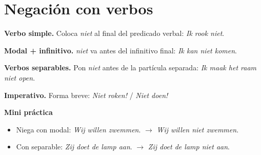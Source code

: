 \section{Negación con verbos}
\textbf{Verbo simple.} Coloca \textit{niet} al final del predicado verbal: \textit{Ik rook niet}.

\textbf{Modal + infinitivo.} \textit{niet} va antes del infinitivo final: \textit{Ik kan niet komen}.

\textbf{Verbos separables.} Pon \textit{niet} antes de la partícula separada: \textit{Ik maak het raam niet open}.

\textbf{Imperativo.} Forma breve: \textit{Niet roken!} / \textit{Niet doen!}

\textbf{Mini práctica}
\begin{itemize}[leftmargin=*]
  \item Niega con modal: \textit{Wij willen zwemmen}. $\rightarrow$ \textit{Wij willen niet zwemmen}.
  \item Con separable: \textit{Zij doet de lamp aan}. $\rightarrow$ \textit{Zij doet de lamp niet aan}.
\end{itemize}
